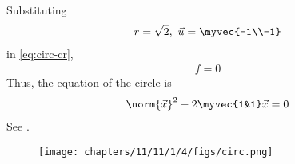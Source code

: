 Substituting
\begin{align}
	 r = \sqrt{2},\
	\vec{u}
	 = \myvec{-1\\-1}
\end{align}
in 
	\eqref{eq:circ-cr},
\begin{align}
	f 
	  =0	
\end{align}
Thus, the equation of the circle is 
\begin{align}
	\norm{\vec{x}}^2 -2\myvec{1&1}\vec{x} = 0       		       
\end{align}	
See 
.
\begin{figure}[H]
	\begin{center} 
	  \texttt{[image: chapters/11/11/1/4/figs/circ.png]}
	\end{center}
\caption{}
\label{fig:chapters/11/11/1/4/Fig1}
\end{figure}
